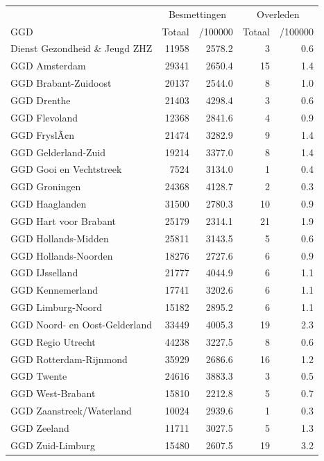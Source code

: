 \documentclass[
  english,
  man,floatsintext]{apa6}
\begin{document}
\begin{table}
\centering\begingroup\fontsize{10}{12}\selectfont

\begin{threeparttable}
\begin{tabular}{lrrrr}
\toprule
\multicolumn{1}{c}{ } & \multicolumn{2}{c}{Besmettingen} & \multicolumn{2}{c}{Overleden} \\
\cmidrule(l{3pt}r{3pt}){2-3} \cmidrule(l{3pt}r{3pt}){4-5}
GGD & Totaal & /100000 & Totaal & /100000\\
\midrule
Dienst Gezondheid \& Jeugd ZHZ & 11958 & 2578.2 & 3 & 0.6\\
GGD Amsterdam & 29341 & 2650.4 & 15 & 1.4\\
GGD Brabant-Zuidoost & 20137 & 2544.0 & 8 & 1.0\\
GGD Drenthe & 21403 & 4298.4 & 3 & 0.6\\
GGD Flevoland & 12368 & 2841.6 & 4 & 0.9\\
GGD FryslÃ¢n & 21474 & 3282.9 & 9 & 1.4\\
GGD Gelderland-Zuid & 19214 & 3377.0 & 8 & 1.4\\
GGD Gooi en Vechtstreek & 7524 & 3134.0 & 1 & 0.4\\
GGD Groningen & 24368 & 4128.7 & 2 & 0.3\\
GGD Haaglanden & 31500 & 2780.3 & 10 & 0.9\\
GGD Hart voor Brabant & 25179 & 2314.1 & 21 & 1.9\\
GGD Hollands-Midden & 25811 & 3143.5 & 5 & 0.6\\
GGD Hollands-Noorden & 18276 & 2727.6 & 6 & 0.9\\
GGD IJsselland & 21777 & 4044.9 & 6 & 1.1\\
GGD Kennemerland & 17741 & 3202.6 & 6 & 1.1\\
GGD Limburg-Noord & 15182 & 2895.2 & 6 & 1.1\\
GGD Noord- en Oost-Gelderland & 33449 & 4005.3 & 19 & 2.3\\
GGD Regio Utrecht & 44238 & 3227.5 & 8 & 0.6\\
GGD Rotterdam-Rijnmond & 35929 & 2686.6 & 16 & 1.2\\
GGD Twente & 24616 & 3883.3 & 3 & 0.5\\
GGD West-Brabant & 15810 & 2212.8 & 5 & 0.7\\
GGD Zaanstreek/Waterland & 10024 & 2939.6 & 1 & 0.3\\
GGD Zeeland & 11711 & 3027.5 & 5 & 1.3\\
GGD Zuid-Limburg & 15480 & 2607.5 & 19 & 3.2\\

\end{tabular}
\end{threeparttable}
\end{table}
\end{document}

